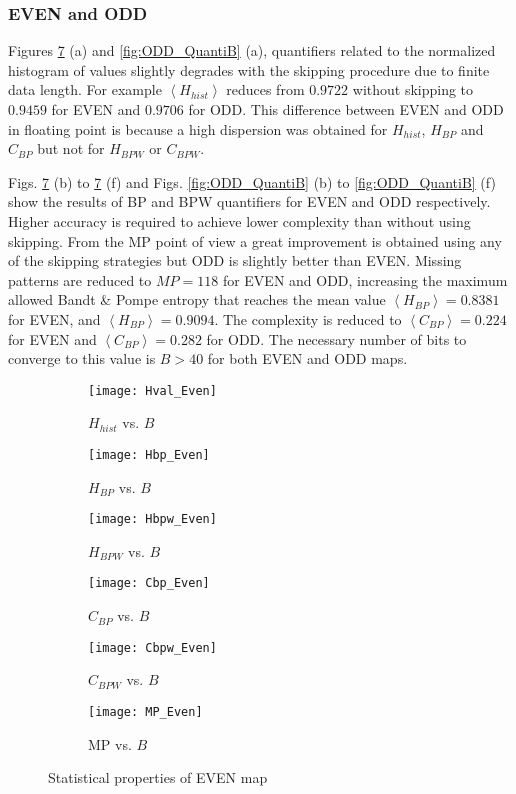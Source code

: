 \subsubsection{EVEN and ODD} \label{sssec:skipp}

Figures \ref{fig:EVEN_QuantiB} (a) and \ref{fig:ODD_QuantiB} (a), quantifiers related to the normalized histogram of values slightly degrades with the skipping procedure due to finite data length.
For example $\left\langle H_{hist}\right\rangle $ reduces from $0.9722$ without skipping to $0.9459$ for EVEN and $0.9706$ for ODD. 
This difference between EVEN and ODD in floating point is because a high dispersion was obtained for $H_{hist}$, $H_{BP}$ and $C_{BP}$ but not for $H_{BPW}$ or $C_{BPW}$.

Figs. \ref{fig:EVEN_QuantiB} (b) to \ref{fig:EVEN_QuantiB} (f) and Figs. \ref{fig:ODD_QuantiB} (b) to \ref{fig:ODD_QuantiB} (f) show the results of BP and BPW quantifiers for EVEN and ODD respectively.
Higher accuracy is required to achieve lower complexity than without using skipping.
From the MP point of view a great improvement is obtained using any of the skipping strategies but ODD is slightly better than EVEN.
Missing patterns are reduced to $MP = 118$ for EVEN and ODD, increasing the maximum allowed Bandt \& Pompe entropy that reaches the mean value $\left\langle H_{BP}\right\rangle  = 0.8381$ for EVEN, and $\left\langle H_{BP}\right\rangle  = 0.9094$.
The complexity is reduced to $\left\langle C_{BP}\right\rangle = 0.224$ for EVEN and $\left\langle C_{BP}\right\rangle = 0.282$ for ODD.
The necessary number of bits to converge to this value is $B>40$ for both EVEN and ODD maps.

\begin{figure}[htpb]
	\centering
	\begin{subfigure}[b]{0.49\textwidth}
		\texttt{[image: Hval\_Even]}
		\caption{$H_{hist}$ vs. $B$}
		\label{fig:Hval_Even}
	\end{subfigure}
	\begin{subfigure}[b]{0.49\textwidth}
		\texttt{[image: Hbp\_Even]}
		\caption{$H_{BP}$ vs. $B$}
		\label{fig:Hbp_Even}
	\end{subfigure}
	\begin{subfigure}[b]{0.49\textwidth}
		\texttt{[image: Hbpw\_Even]}
		\caption{$H_{BPW}$ vs. $B$}
		\label{fig:Hbpw_Even}
	\end{subfigure}
	\begin{subfigure}[b]{0.49\textwidth}
		\texttt{[image: Cbp\_Even]}
		\caption{$C_{BP}$ vs. $B$}
		\label{fig:Cbp_Even}
	\end{subfigure}
	\begin{subfigure}[b]{0.49\textwidth}
		\texttt{[image: Cbpw\_Even]}
		\caption{$C_{BPW}$ vs. $B$}
		\label{fig:Cbpw_Even}
	\end{subfigure}
	\begin{subfigure}[b]{0.49\textwidth}
		\texttt{[image: MP\_Even]}
		\caption{MP vs. $B$}
		\label{fig:MP_Even}
	\end{subfigure}
	\caption{Statistical properties of EVEN map}
	\label{fig:EVEN_QuantiB}
\end{figure}

